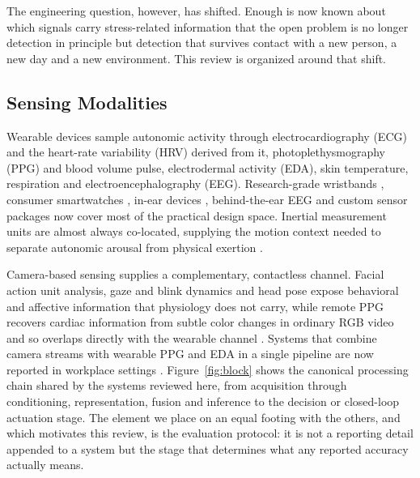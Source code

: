\documentclass[11pt,a4paper]{article}
\begin{document}
The engineering question, however, has shifted. Enough is now known about which signals carry
stress-related information that the open problem is no longer detection in principle but
detection that survives contact with a new person, a new day and a new environment. This
review is organized around that shift.

\subsection{Sensing Modalities}
Wearable devices sample autonomic activity through electrocardiography (ECG) and the
heart-rate variability (HRV) derived from it, photoplethysmography (PPG) and blood volume
pulse, electrodermal activity (EDA), skin temperature, respiration and
electroencephalography (EEG). Research-grade wristbands \cite{r12,r19}, consumer smartwatches
\cite{r13,r25}, in-ear devices \cite{r43}, behind-the-ear EEG \cite{r31} and custom sensor
packages \cite{r14,r108} now cover most of the practical design space. Inertial measurement
units are almost always co-located, supplying the motion context needed to separate
autonomic arousal from physical exertion \cite{r19,r79}.

Camera-based sensing supplies a complementary, contactless channel. Facial action unit
analysis, gaze and blink dynamics and head pose expose behavioral and affective information
that physiology does not carry, while remote PPG recovers cardiac information from subtle
color changes in ordinary RGB video and so overlaps directly with the wearable channel
\cite{r16}. Systems that combine camera streams with wearable PPG and EDA in a single
pipeline are now reported in workplace settings \cite{r17}. Figure~\ref{fig:block} shows the
canonical processing chain shared by the systems reviewed here, from acquisition through
conditioning, representation, fusion and inference to the decision or closed-loop actuation
stage. The element we place on an equal footing with the others, and which motivates this
review, is the evaluation protocol: it is not a reporting detail appended to a system but the
stage that determines what any reported accuracy actually means.
\end{document}
